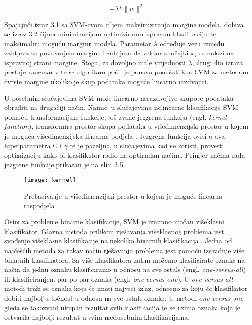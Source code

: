 \documentclass[times, utf8, zavrsni]{fer}
\begin{document}
\begin{equation}
	[\frac{1}{n} \sum_{i=1}^{n} max(0,1-y_{i}(\overrightarrow{w} * \overrightarrow{x_{i}} - b))] + \lambda * \|w\|^2
\end{equation}
\newline

Spajajući izraz 3.1 sa SVM-ovom ciljem maksimiziranja margine modela, dobiva se izraz 3.2 čijom minimizacijom optimiziramo ispravnu klasifikaciju te maksimalnu moguću marginu modela. Parametar $\lambda$ određuje vezu između zahtjeva za povećanjem margine i zahtjeva da vektor značajki $x_{i}$ se nalazi na ispravnoj strani margine. Stoga, za dovoljno male vrijednosti $\lambda$, drugi dio izraza postaje zanemariv te se algoritam počinje ponovo ponašati kao SVM sa metodom čvrste margine ukoliko je skup podataka moguće linearno razdvojiti. \newline

U posebnim slučajevima SVM može linearno nerazdvojive skupove podataka obraditi na drugačiji način. Naime, u slučajevima nelinearne klasifikacije SVM pomoću transformacijske funkcije, još zvane jezgrena funkcija (engl. \textit{kernel function}), transformira prostor skupa podataka u višedimenzijski prostor u kojem je moguća višedimenzijska linearna podjela \citep{kernel}. Jezgrena funkcija ovisi o dva hiperparametra C i $\gamma$ te je poželjno, u slučajevima kad se koristi, provesti optimizaciju kako bi klasifikator radio na optimalan načinu. Primjer načina rada jezgrene funkcije prikazan je na slici 3.5.

\begin{figure}[h]
	\centering
	\texttt{[image: kernel]}
	\caption{Prebacivanje u višedimenzijski prostor u kojem je moguće linearna raspodjela\protect\footnotemark}
\end{figure}



Osim za probleme binarne klasifikacije, SVM je iznimno moćan višeklasni klasifikator. Glavna metoda prilikom rješavanja višeklasnog problema jest svođenje višeklasne klasifikacije na nekoliko binarnih klasifikacija \citep{svm_multiclass}. Jedna od najčešćih metoda za takav način rješavanja problema jest pomoću izgradnje više binarnih klasifikatora. Sa više klasifikatora zatim možemo klasificirate oznake na način da jednu oznaku klasificiramo u odnosu na sve ostale (engl. \textit{one-versus-all}) ili klasificiranjem par po par oznaka (engl. \textit{one-versus-one}).
 U \textit{one-versus-all} metodi traži se oznaka koja će imati najveći izlaz, odnosno za koju će klasifikator dobiti najbolju točnost u odnosu na sve ostale oznake. U metodi \textit{one-versus-one} gleda se takozvani ukupan rezultat svih klasifikacija te se uzima oznaka koja je ostvarila najbolji rezultat u svim međusobnim klasifikacijama.
 
\end{document}
